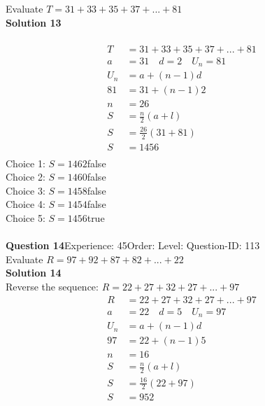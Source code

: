 \documentclass{article}
\begin{document}
Evaluate $T=31+33+35+37+...+81$\\[4pt]
\noindent\textbf{Solution 13}\\[2pt]
\\[-35pt]\begin{align*}
T&=31+33+35+37+...+81\\[2pt]
a&=31\quad d=2 \quad U_n=81\\[2pt]
U_n&=a+(n-1)d\\[2pt]
81&=31+(n-1)2\\[2pt]
n&=26\\[12pt]
S&=\displaystyle\frac{n}{2}(a+l)\\[2pt]
S&=\displaystyle\frac{26}{2}(31+81)\\[2pt]
S&=1456\\[-140pt]
\end{align*}
Choice 1: \hspace{20pt}$S=1462$\hspace{20pt}false\\
Choice 2: \hspace{20pt}$S=1460$\hspace{20pt}false\\
Choice 3: \hspace{20pt}$S=1458$\hspace{20pt}false\\
Choice 4: \hspace{20pt}$S=1454$\hspace{20pt}false\\
Choice 5: \hspace{20pt}$S=1456$\hspace{20pt}true\\
\\[4pt]
\noindent\textbf{Question 14}\hspace{20pt}Experience: 45\hspace{20pt}Order: \hspace{20pt}Level: \hspace{20pt}Question-ID: 113\\[2pt]
Evaluate $R=97+92+87+82+...+22$\\[4pt]
\noindent\textbf{Solution 14}\\[2pt]
Reverse the sequence: $R=22+27+32+27+...+97$
\begin{align*}
R&=22+27+32+27+...+97\\[2pt]
a&=22\quad d=5 \quad U_n=97\\[2pt]
U_n&=a+(n-1)d\\[2pt]
97&=22+(n-1)5\\[2pt]
n&=16\\[12pt]
S&=\displaystyle\frac{n}{2}(a+l)\\[2pt]
S&=\displaystyle\frac{16}{2}(22+97)\\[2pt]
S&=952\\
\end{align*}
\end{document}
